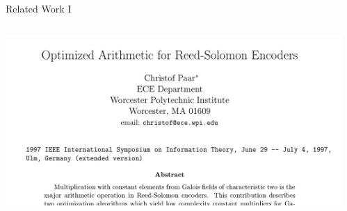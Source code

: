 \begin{frame}{Related Work I}{}
    \begin{columns}
        \begin{column}{0.75\textwidth}
            \centering
            \includegraphics[width=\textwidth]{data/paar}
        \end{column}
        \begin{column}{0.2\textwidth}
            \centering
        \end{column}
    \end{columns}
\end{frame}

